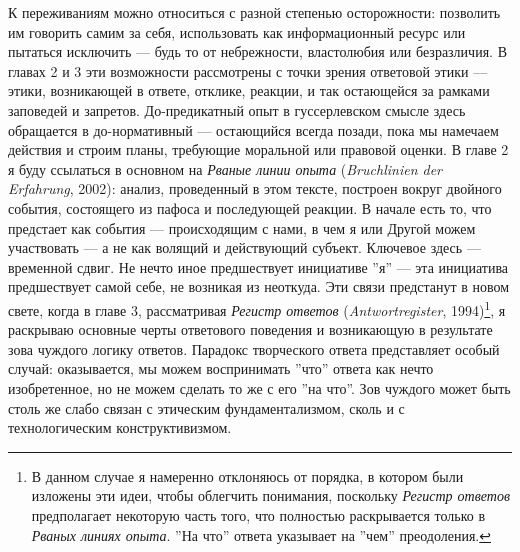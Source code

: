 \documentclass[12pt]{book}
\begin{document}
К переживаниям можно относиться с разной степенью осторожности: позволить им говорить самим за себя, использовать как информационный ресурс или пытаться исключить --- будь то от небрежности, властолюбия или безразличия. В главах 2 и 3 эти возможности рассмотрены с точки зрения ответовой этики --- этики, возникающей в ответе, отклике, реакции, и так остающейся за рамками заповедей и запретов. До-предикатный опыт в гуссерлевском смысле здесь обращается в до-нормативный --- остающийся всегда позади, пока мы намечаем действия и строим планы, требующие моральной или правовой оценки. В главе 2 я буду ссылаться в основном на \textit{Рваные линии опыта} (\textit{Bruchlinien der Erfahrung}, 2002): анализ, проведенный в этом тексте, построен вокруг двойного события, состоящего из пафоса и последующей реакции. В начале есть то, что предстает как события --- происходящим с нами, в чем я или Другой можем участвовать --- а не как волящий и действующий субъект. Ключевое здесь --- временной сдвиг. Не нечто иное предшествует инициативе ''я'' --- эта инициатива предшествует самой себе, не возникая из неоткуда. Эти связи предстанут в новом свете, когда в главе 3, рассматривая \textit{Регистр ответов} (\textit{Antwortregister}, 1994)\footnote{В данном случае я намеренно отклоняюсь от порядка, в котором были изложены эти идеи, чтобы облегчить понимания, поскольку \textit{Регистр ответов} предполагает некоторую часть того, что полностью раскрывается только в \textit{Рваных линиях опыта}. ''На что'' ответа указывает на ''чем'' преодоления.}, я раскрываю основные черты ответового поведения и возникающую в результате зова чуждого логику ответов. Парадокс творческого ответа представляет особый случай: оказывается, мы можем воспринимать ''что'' ответа как нечто изобретенное, но не можем сделать то же с его ''на что''. Зов чуждого может быть столь же слабо связан с этическим фундаментализмом, сколь и с технологическим конструктивизмом.
\end{document}

